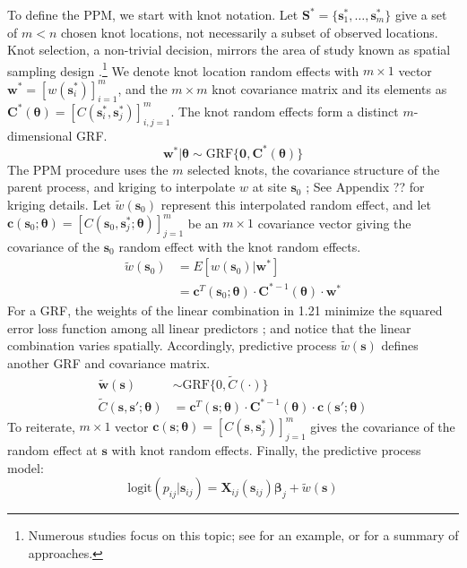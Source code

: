 To define the PPM, we start with knot notation. Let $\pmb{S}^{*} = \{\pmb{s}_{1}^{*}, \dots, \pmb{s}_{m}^{*}\}$ give a set of $m < n$ chosen knot locations, not necessarily a subset of observed locations. Knot selection, a non-trivial decision, mirrors the area of study known as spatial sampling design \citep{Finley2009}.\footnote{Numerous studies focus on this topic; see \citep{Zhu2005} for an example, or \citep{Xia2006} for a summary of approaches.} We denote knot location random effects with $m \times 1$ vector $\pmb{w}^{*} = \left[w(\pmb{s}_{i}^{*})\right]_{i=1}^{m}$, and the $m \times m$ knot covariance matrix and its elements as $\pmb{C}^{*}(\pmb{\theta}) = \left[C(\pmb{s}_{i}^{*}, \pmb{s}_{j}^{*})\right]_{i,j = 1}^{m}$. The knot random effects form a distinct $m$-dimensional GRF.
\begin{equation}
\pmb{w}^{*}|\pmb{\theta} \sim \text{GRF}\{\pmb{0}, \pmb{C}^{*}(\pmb{\theta})\}
\end{equation}
The PPM procedure uses the $m$ selected knots, the covariance structure of the parent process, and kriging to interpolate $w$ at site $\pmb{s}_{0}$ \citep{Schabenberger2004}; See Appendix ?? for kriging details. Let $\tilde{w}(\pmb{s}_{0})$ represent this interpolated random effect, and let $\pmb{c}(\pmb{s}_{0};\pmb{\theta}) = \left[C(\pmb{s}_{0}, \pmb{s}_{j}^{*}; \pmb{\theta})\right]_{j = 1}^{m}$ be an $m \times 1$  covariance vector giving the covariance of the $\pmb{s}_{0}$ random effect with the knot random effects.
\begin{align}
\tilde{w}(\pmb{s}_{0}) &= E[w(\pmb{s}_{0})|\pmb{w}^{*}] \\ 
&= \pmb{c}^{T}(\pmb{s}_{0};\pmb{\theta}) \cdot \pmb{C}^{*-1}(\pmb{\theta}) \cdot \pmb{w}^{*}
\end{align}
For a GRF, the weights of the linear combination in 1.21 minimize the squared error loss function among all linear predictors \citep{Schabenberger2004}; and notice that the linear combination varies spatially. Accordingly, predictive process $\tilde{w}(\pmb{s})$ defines another GRF and covariance matrix.
\begin{align}
\tilde{\pmb{w}}(\pmb{s}) &\sim \text{GRF}\{0, \tilde{C}(\cdot)\} \\
\tilde{C}(\pmb{s}, \pmb{s}'; \pmb{\theta}) &= \pmb{c}^{T}(\pmb{s};\pmb{\theta}) \cdot \pmb{C}^{*-1}(\pmb{\theta}) \cdot \pmb{c}(\pmb{s}';\pmb{\theta})
\end{align}
To reiterate, $m \times 1$ vector $\pmb{c}(\pmb{s};\pmb{\theta}) = \left[C(\pmb{s}, \pmb{s}_{j}^{*})\right]_{j = 1}^{m}$ gives the covariance of the random effect at $\pmb{s}$ with knot random effects. Finally, the predictive process model:
\begin{equation}
\text{logit}(p_{ij}|\pmb{s}_{ij}) = \pmb{X}_{ij}(\pmb{s}_{ij}) \pmb{\beta}_{j} + \tilde{w}(\pmb{s})
\end{equation}

